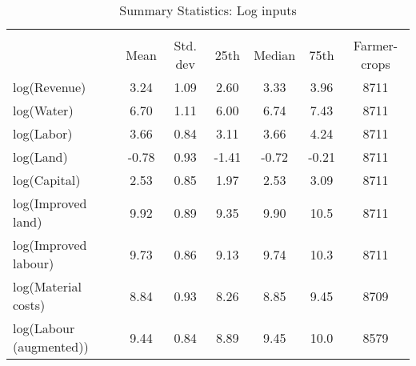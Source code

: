 \begin{table}[htbp]\centering
\def\sym#1{\ifmmode^{#1}\else\(^{#1}\)\fi}
\caption{Summary Statistics: Log inputs}
\begin{tabular*}{1.0\hsize}{@{\hskip\tabcolsep\extracolsep\fill}l*{1}{cccccc}}
\toprule
                                    &\multicolumn{6}{c}{}                                                         \\
                                    &        Mean&    Std. dev&        25th&      Median&        75th&Farmer-crops\\
\midrule
log(Revenue)                        &        3.24&        1.09&        2.60&        3.33&        3.96&        8711\\
log(Water)                          &        6.70&        1.11&        6.00&        6.74&        7.43&        8711\\
log(Labor)                          &        3.66&        0.84&        3.11&        3.66&        4.24&        8711\\
log(Land)                           &       -0.78&        0.93&       -1.41&       -0.72&       -0.21&        8711\\
log(Capital)                        &        2.53&        0.85&        1.97&        2.53&        3.09&        8711\\
log(Improved land)                  &        9.92&        0.89&        9.35&        9.90&        10.5&        8711\\
log(Improved labour)                &        9.73&        0.86&        9.13&        9.74&        10.3&        8711\\
log(Material costs)                 &        8.84&        0.93&        8.26&        8.85&        9.45&        8709\\
log(Labour (augmented))             &        9.44&        0.84&        8.89&        9.45&        10.0&        8579\\
\bottomrule
\end{tabular*}
\end{table}
